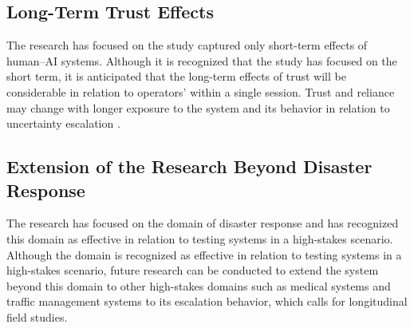 \documentclass[journal]{IEEEtran}
\theoremstyle{plain}
\theoremstyle{definition}
\providecommand{\DIFaddtex}[1]{{\protect\color{blue} \sf #1}} %
\providecommand{\DIFdeltex}[1]{{\protect\color{red} \scriptsize #1}} %
\providecommand{\DIFaddbegin}{} %
\providecommand{\DIFaddend}{} %
\providecommand{\DIFdelbegin}{} %
\providecommand{\DIFdelend}{} %
\providecommand{\DIFadd}[1]{\texorpdfstring{\DIFaddtex{#1}}{#1}} %
\providecommand{\DIFdel}[1]{\texorpdfstring{\DIFdeltex{#1}}{}} %
\newcommand{\DIFscaledelfig}{0.5}
\newlength{\DIFdelgraphicswidth} %
\newlength{\DIFdelgraphicsheight} %
\newcommand{\DIFaddincludegraphics}[2][]{{\color{blue}\fbox{\DIFOincludegraphics[#1]{#2}}}} %
\newcommand{\DIFdelincludegraphics}[2][]{%
\sbox{\DIFdelgraphicsbox}{\DIFOincludegraphics[#1]{#2}}%
\settoboxwidth{\DIFdelgraphicswidth}{\DIFdelgraphicsbox} %
\settoboxtotalheight{\DIFdelgraphicsheight}{\DIFdelgraphicsbox} %
\scalebox{\DIFscaledelfig}{%
\parbox[b]{\DIFdelgraphicswidth}{\usebox{\DIFdelgraphicsbox}\\[-\baselineskip] \rule{\DIFdelgraphicswidth}{0em}}\llap{\resizebox{\DIFdelgraphicswidth}{\DIFdelgraphicsheight}{%
\setlength{\unitlength}{\DIFdelgraphicswidth}%
\begin{picture}(1,1)%
\thicklines\linethickness{2pt} %
{\color[rgb]{1,0,0}\put(0,0){\framebox(1,1){}}}%
{\color[rgb]{1,0,0}\put(0,0){\line( 1,1){1}}}%
{\color[rgb]{1,0,0}\put(0,1){\line(1,-1){1}}}%
\end{picture}%
}\hspace*{3pt}}} %
} %
\DeclareRobustCommand{\DIFaddbegin}{\DIFOaddbegin \let\includegraphics\DIFaddincludegraphics} %
\DeclareRobustCommand{\DIFaddend}{\DIFOaddend \let\includegraphics\DIFOincludegraphics} %
\DeclareRobustCommand{\DIFdelbegin}{\DIFOdelbegin \let\includegraphics\DIFdelincludegraphics} %
\DeclareRobustCommand{\DIFdelend}{\DIFOaddend \let\includegraphics\DIFOincludegraphics} %
\begin{document}
    \subsection{Long-Term Trust Effects}
    The \DIFdelbegin \DIFdel{research has focused on the }\DIFdelend \DIFaddbegin \DIFadd{study captured only }\DIFaddend short-term effects \DIFdelbegin \DIFdel{of human--AI systems. Although it is recognized that the study has focused on the short term, it is anticipated that the long-term effects of trust will be considerable in relation to operators' }\DIFdelend \DIFaddbegin \DIFadd{within a single session. Trust and reliance may change with longer }\DIFaddend exposure to the system and \DIFdelbegin \DIFdel{its behavior in relation to uncertainty escalation .
}%

\subsection{\DIFdel{Extension of the Research Beyond Disaster Response}}
\addtocounter{subsection}{-1}%
\DIFdel{The research has focused on the domain of disaster response and has recognized this domain as effective in relation to testing systems in a high-stakes scenario. Although the domain is recognized as effective in relation to testing systems in a high-stakes scenario, future research can be conducted to extend the system beyond this domain to other high-stakes domains such as medical systems and traffic management systems}\DIFdelend \DIFaddbegin \DIFadd{to its escalation behavior, which calls for longitudinal field studies}\DIFaddend .

\end{document}

